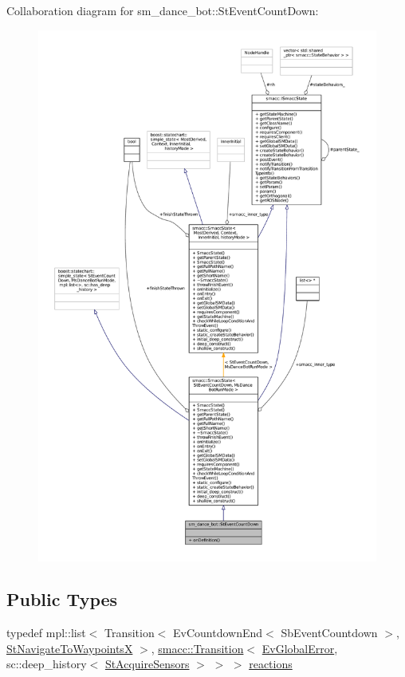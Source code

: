 Collaboration diagram for sm\+\_\+dance\+\_\+bot\+:\+:St\+Event\+Count\+Down\+:
\nopagebreak
\begin{figure}[H]
\begin{center}
\leavevmode
\includegraphics[width=350pt]{structsm__dance__bot_1_1StEventCountDown__coll__graph}
\end{center}
\end{figure}
\subsection*{Public Types}
\begin{DoxyCompactItemize}
\item 
typedef mpl\+::list$<$ Transition$<$ Ev\+Countdown\+End$<$ Sb\+Event\+Countdown $>$, \hyperlink{structsm__dance__bot_1_1StNavigateToWaypointsX}{St\+Navigate\+To\+WaypointsX} $>$, \hyperlink{classsmacc_1_1Transition}{smacc\+::\+Transition}$<$ \hyperlink{structsm__dance__bot_1_1EvGlobalError}{Ev\+Global\+Error}, sc\+::deep\+\_\+history$<$ \hyperlink{structsm__dance__bot_1_1StAcquireSensors}{St\+Acquire\+Sensors} $>$ $>$ $>$ \hyperlink{structsm__dance__bot_1_1StEventCountDown_a9faee246b8150ab2b4a01a40bcdcac91}{reactions}
\end{DoxyCompactItemize}
